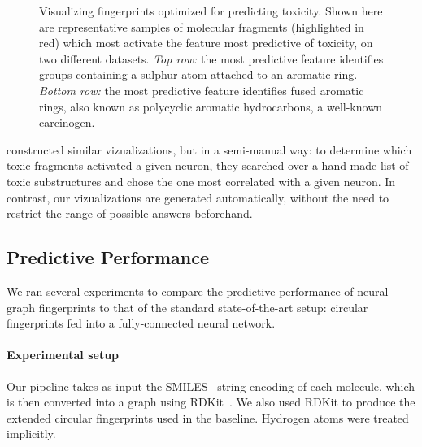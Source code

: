 \documentclass{article}
\newcommand{\citep}{\cite}
\newcommand{\citet}{\cite}
\begin{document}
\begin{figure}[h]
\begin{tabular}{>{\centering}m{1in} >{\centering}m{3.1cm} >{\centering}m{3.3cm} >{\centering\arraybackslash}m{3.1cm}}
\end{tabular}
\vspace{-3mm}
\caption{Visualizing fingerprints optimized for predicting toxicity.
Shown here are representative samples of molecular fragments (highlighted in red) which most activate the feature most predictive of toxicity, on two different datasets.
\emph{Top row:} the most predictive feature identifies groups containing a sulphur atom attached to an aromatic ring.
\emph{Bottom row:} the most predictive feature identifies fused aromatic rings, also known as polycyclic aromatic hydrocarbons, a well-known carcinogen.
}
\label{fig:learned features toxicity}
\end{figure}

\citet{unterthiner2015toxicity} constructed similar vizualizations, but in a semi-manual way: to determine which toxic fragments activated a given neuron, they searched over a hand-made list of toxic substructures and chose the one most correlated with a given neuron.
In contrast, our vizualizations are generated automatically, without the need to restrict the range of possible answers beforehand.

\subsection{Predictive Performance}

We ran several experiments to compare the predictive performance of neural graph fingerprints to that of the standard state-of-the-art setup: circular fingerprints fed into a fully-connected neural network.

\paragraph{Experimental setup}
Our pipeline takes as input the SMILES~\citep{weininger1988smiles} string encoding of each molecule, which is then converted into a graph using RDKit~\citep{rdkit}.
We also used RDKit to produce the extended circular fingerprints used in the baseline.
Hydrogen atoms were treated implicitly.
\end{document}
